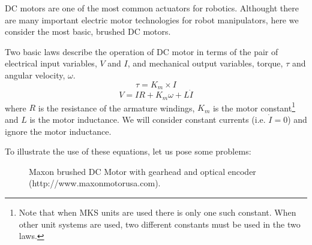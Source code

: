 DC motors are one of the most common actuators for robotics.
Althought there are many important electric motor technologies for
robot manipulators, here we consider the most basic, brushed DC motors.

Two basic laws   describe the operation of DC motor in terms of
the pair of electrical input variables, $V$ and $I$, and mechanical
output variables, torque, $\tau$ and angular velocity, $\omega$.
\begin{equation}\label{Law1}
\tau = K_m \times I
\end{equation}
\begin{equation}\label{Law2}
V = IR + K_m\omega + L \dot{I}
\end{equation}
where $R$ is the resistance of the armature windings, $K_m$ is the
motor constant\footnote{Note that when MKS units are used there is only one
such constant. When other unit systems are used, two different constants must be used
in the two laws.} and $L$ is the motor inductance.  We will consider
constant currents (i.e. $\dot{I}=0$) and  ignore the
motor inductance.

To illustrate the use of these equations, let us pose some problems:

\begin{figure}
\centering
{}
\caption{Maxon brushed DC Motor with gearhead and optical encoder (http://www.maxonmotorusa.com). }
\end{figure}

